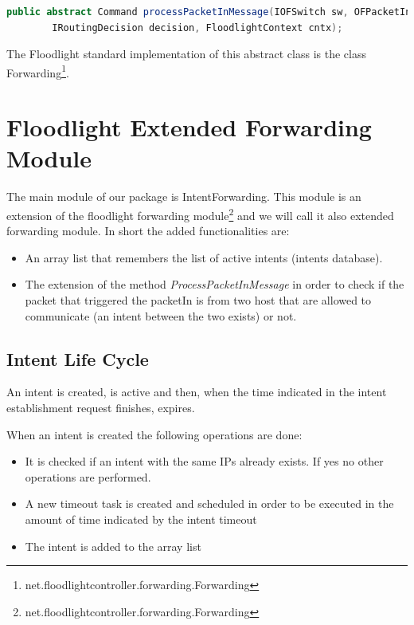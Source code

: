 \documentclass[a4paper]{report}
\begin{document}
	\begin{lstlisting}[language=Java]
		public abstract Command processPacketInMessage(IOFSwitch sw, OFPacketIn pi, 
		IRoutingDecision decision, FloodlightContext cntx);
	\end{lstlisting}
	
	
	\noindent The Floodlight standard implementation of this abstract class is the class Forwarding\footnote{net.floodlightcontroller.forwarding.Forwarding}.
	
	\section{Floodlight Extended Forwarding Module}\label{forwarding}
\noindent The main module of our package is IntentForwarding. This module is an extension of the floodlight  forwarding module\footnote{net.floodlightcontroller.forwarding.Forwarding} and we will call it also extended forwarding module. In short the added functionalities are:

\begin{itemize}
	\item An array list that remembers the list of active intents (intents database).
	\item The extension of the method \textit{ProcessPacketInMessage} in order to check if the packet that triggered the packetIn is from two host that are allowed to communicate (an intent between the two exists) or not. 
\end{itemize}


\subsection{Intent Life Cycle}
\noindent An intent is created, is active and then, when the time indicated in the intent establishment request finishes, expires.

\noindent When an intent is created the following operations are done:
\begin{itemize}
	\item It is checked if an intent with the same IPs already exists. If yes no other operations are performed.
	
	\item A new timeout task is created and scheduled in order to be executed in the amount of time indicated by the intent timeout
	
	\item The intent is added to the array list
\end{itemize}
\end{document}
